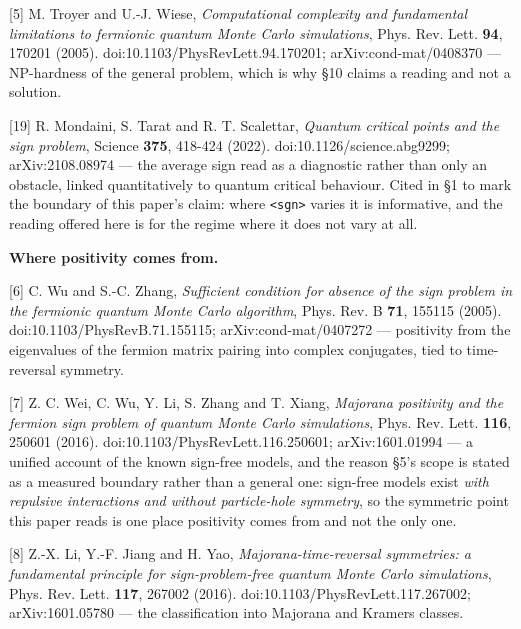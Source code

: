 \documentclass[10pt,letterpaper,twocolumn]{article}
\begin{document}
{[}5{]} M. Troyer and U.-J. Wiese, \emph{Computational complexity and fundamental limitations to fermionic
quantum Monte Carlo simulations}, Phys. Rev. Lett. \textbf{94}, 170201 (2005).
doi:\allowbreak{}10.\allowbreak{}1103/\allowbreak{}PhysRevL\allowbreak{}ett.\allowbreak{}94.\allowbreak{}170201; arXiv:cond-mat/0408370 --- NP-hardness of the general problem,
which is why §10 claims a reading and not a solution.

{[}19{]} R. Mondaini, S. Tarat and R. T. Scalettar, \emph{Quantum critical points and the sign problem},
Science \textbf{375}, 418-424 (2022). doi:\allowbreak{}10.\allowbreak{}1126/\allowbreak{}science.\allowbreak{}abg9299; arXiv:2108.08974 --- the average sign
read as a diagnostic rather than only an obstacle, linked quantitatively to quantum critical
behaviour. Cited in §1 to mark the boundary of this paper's claim: where \texttt{\textless{}\allowbreak{}sgn\textgreater{}\allowbreak{}} varies it is
informative, and the reading offered here is for the regime where it does not vary at all.

\textbf{Where positivity comes from.}

{[}6{]} C. Wu and S.-C. Zhang, \emph{Sufficient condition for absence of the sign problem in the fermionic
quantum Monte Carlo algorithm}, Phys. Rev. B \textbf{71}, 155115 (2005).
doi:\allowbreak{}10.\allowbreak{}1103/\allowbreak{}PhysRevB\allowbreak{}.\allowbreak{}71.\allowbreak{}155115; arXiv:cond-mat/0407272 --- positivity from the eigenvalues of the
fermion matrix pairing into complex conjugates, tied to time-reversal symmetry.

{[}7{]} Z. C. Wei, C. Wu, Y. Li, S. Zhang and T. Xiang, \emph{Majorana positivity and the fermion sign
problem of quantum Monte Carlo simulations}, Phys. Rev. Lett. \textbf{116}, 250601 (2016).
doi:\allowbreak{}10.\allowbreak{}1103/\allowbreak{}PhysRevL\allowbreak{}ett.\allowbreak{}116.\allowbreak{}250601; arXiv:1601.01994 --- a unified account of the known sign-free
models, and the reason §5's scope is stated as a measured boundary rather than a general one:
sign-free models exist \emph{with repulsive interactions and without particle-hole symmetry}, so the
symmetric point this paper reads is one place positivity comes from and not the only one.

{[}8{]} Z.-X. Li, Y.-F. Jiang and H. Yao, \emph{Majorana-time-reversal symmetries: a fundamental principle
for sign-problem-free quantum Monte Carlo simulations}, Phys. Rev. Lett. \textbf{117}, 267002 (2016).
doi:\allowbreak{}10.\allowbreak{}1103/\allowbreak{}PhysRevL\allowbreak{}ett.\allowbreak{}117.\allowbreak{}267002; arXiv:1601.05780 --- the classification into Majorana and
Kramers classes.
\end{document}

